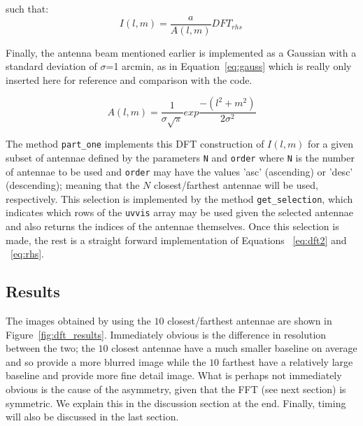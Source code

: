 \documentclass[11pt,letterpaper]{article}
\begin{document}
such that:
\begin{equation}\label{eq:dft2}
I(l,m)= \frac{a}{A(l,m)} DFT_{rhs} \,
\end{equation}

Finally, the antenna beam mentioned earlier is implemented as a Gaussian with a standard deviation of $\sigma$=1 arcmin, as in Equation~\ref{eq:gauss} which is really only inserted here for reference and comparison with the code.

\begin{equation}\label{eq:gauss}
A(l,m)= \frac{1}{\sigma \sqrt{\pi}} exp{ \frac{-(l^{2} + m^{2})}{2 \sigma^{2}} }
\end{equation}

The method \texttt{part\_one} implements this DFT construction of $I(l,m)$ for a given subset of antennae defined by the parameters \texttt{N} and \texttt{order} where \texttt{N} is the number of antennae to be used and \texttt{order} may have the values 'asc' (ascending) or 'desc' (descending); meaning that the $N$ closest/farthest antennae will be used, respectively. This selection is implemented by the method \texttt{get\_selection}, which indicates which rows of the \texttt{uvvis} array may be used given the selected antennae and also returns the indices of the antennae themselves. Once this selection is made, the rest is a straight forward implementation of Equations ~\ref{eq:dft2} and ~\ref{eq:rhs}.

\subsection{Results}

The images obtained by using the $10$ closest/farthest antennae are shown in Figure~\ref{fig:dft_results}. Immediately obvious is the difference in resolution between the two; the $10$ closest antennae have a much smaller baseline on average and so provide a more blurred image while the $10$ farthest have a relatively large baseline and provide more fine detail image. What is perhaps not immediately obvious is the cause of the asymmetry, given that the FFT (see next section) is symmetric. We explain this in the discussion section at the end. Finally, timing will also be discussed in the last section.
\end{document}
